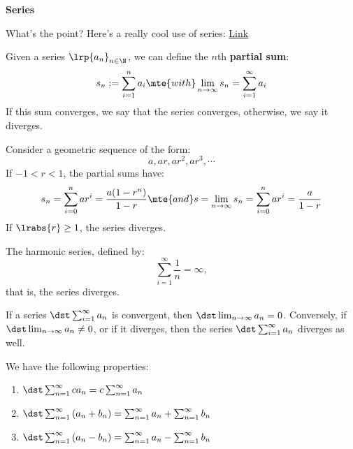 
\chead{\today}
\graphicspath{ {\string~/Desktop} }
\usetikzlibrary{arrows}
\newcommand{\ans}[1]{ \noindent {\color{red} \textbf{Answer:} #1}}
\renewcommand{\ans}[1]{\vspace{3in}}

\begin{center}
\textbf{Series}
\end{center}

\begin{aun}
What's the point? Here's a really cool use of series: \href{https://www.desmos.com/calculator/dzp8ygiudo}{Link}
\end{aun}


\begin{defi}[Series]
Given a series $\lrp{a_n}_{n\in \N}$, we can define the $n$th \textbf{partial sum}:
\[
s_n := \sum_{i = 1}^n a_i \mte{ with }  \lim_{n \to \infty} s_n = \sum_{i = 1}^\infty a_i 
\]
If this sum converges, we say that the series converges, otherwise, we say it diverges. 
\end{defi}
\begin{defi}
Consider a geometric sequence of the form:
\[
a, ar, ar^2, ar^3, \cdots
\]
If $-1 < r < 1$, the partial sums have:
\[
s_n = \sum_{i = 0}^n ar^i = \frac{a (1-r^n)}{1-r} \mte{ and } s = \lim_{n \to \infty} s_n = \sum_{i = 0}^n ar^i = \frac{a}{1-r}
\]
If $\lrabs{r} \geq 1$, the series diverges.
\end{defi}
\begin{thm}
The harmonic series, defined by:
\[
\sum_{i = 1}^\infty \frac1n = \infty,
\]
that is, the series diverges.
\end{thm}
\begin{thm}
If a series $\dst \sum_{i = 1}^\infty a_n$ is convergent, then $\dst \lim_{n \to \infty} a_n = 0$. Conversely, if $\dst \lim_{n \to \infty} a_n \neq 0$, or if it diverges, then the series $\dst \sum_{i = 1}^\infty a_n$ diverges as well. 
\end{thm}

\begin{thm}
We have the following properties:
\begin{enumerate}[label=\roman*.]
\item $\dst \sum_{n=1}^{\infty} c a_n=c \sum_{n=1}^{\infty} a_n$
\item $\dst \sum_{n=1}^{\infty}\left(a_n+b_n\right)=\sum_{n=1}^{\infty} a_n+\sum_{n=1}^{\infty} b_n$
\item $\dst \sum_{n=1}^{\infty}\left(a_n-b_n\right)=\sum_{n=1}^{\infty} a_n-\sum_{n=1}^{\infty} b_n$
\end{enumerate}

\end{thm}


